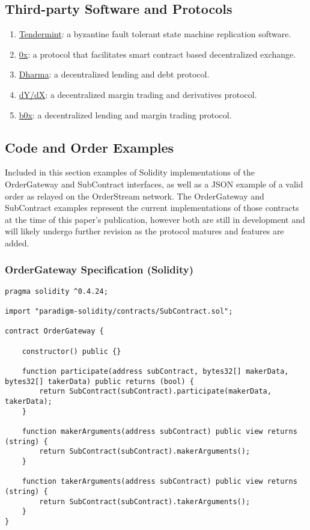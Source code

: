 \documentclass[9pt]{article}
\begin{document}
\subsection{Third-party Software and Protocols}
\begin{enumerate}
\item \underline{Tendermint}: a byzantine fault tolerant state machine replication software.
\item \underline{0x}: a protocol that facilitates smart contract based decentralized exchange.
\item \underline{Dharma}: a decentralized lending and debt protocol.
\item \underline{dY/dX}: a decentralized margin trading and derivatives protocol.
\item \underline{b0x}: a decentralized lending and margin trading protocol.
\end{enumerate}

\subsection{Code and Order Examples}
\noindent Included in this section examples of Solidity implementations of the OrderGateway and SubContract interfaces, as well as a JSON example of a valid order as relayed on the OrderStream network. The OrderGateway and SubContract examples represent the current implementations of those contracts at the time of this paper's publication, however both are still in development and will likely undergo further revision as the protocol matures and features are added.

\subsubsection{OrderGateway Specification (Solidity)}\label{ordergateway code}
\begin{lstlisting}[language=Solidity]
pragma solidity ^0.4.24;

import "paradigm-solidity/contracts/SubContract.sol";

contract OrderGateway {

    constructor() public {}

    function participate(address subContract, bytes32[] makerData, bytes32[] takerData) public returns (bool) {
        return SubContract(subContract).participate(makerData, takerData);
    }

    function makerArguments(address subContract) public view returns (string) {
        return SubContract(subContract).makerArguments();
    }

    function takerArguments(address subContract) public view returns (string) {
        return SubContract(subContract).takerArguments();
    }
}
\end{lstlisting}
\end{document}
